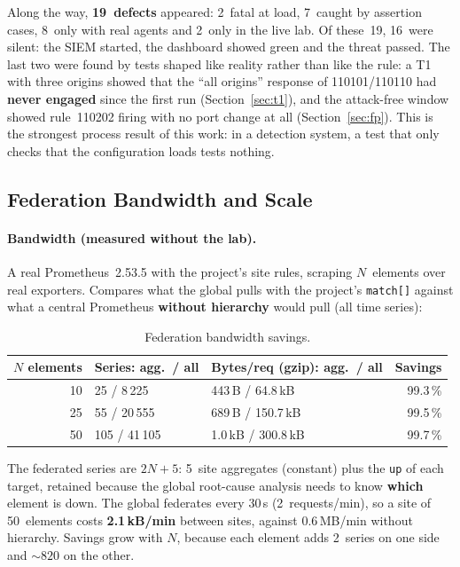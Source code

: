 \documentclass[11pt,a4paper]{article}
\begin{document}
Along the way, \textbf{19~defects} appeared: 2~fatal at load, 7~caught by assertion cases,
8~only with real agents and 2~only in the live lab. Of these~19, 16~were silent: the SIEM
started, the dashboard showed green and the threat passed. The last two were found by tests
shaped like reality rather than like the rule: a T1 with three origins showed that the
``all origins'' response of 110101/110110 had \textbf{never engaged} since the first run
(Section~\ref{sec:t1}), and the attack-free window showed rule~110202 firing with no port
change at all (Section~\ref{sec:fp}). This is the strongest process result of this work: in a
detection system, a test that only checks that the configuration loads tests nothing.

\subsection{Federation Bandwidth and Scale}

\paragraph{Bandwidth (measured without the lab).} A real Prometheus~2.53.5 with the project's
site rules, scraping $N$~elements over real exporters. Compares what the global pulls with
the project's \texttt{match[]} against what a central Prometheus \textbf{without hierarchy}
would pull (all time series):

\begin{table}[H]
  \centering
  \caption{Federation bandwidth savings.}
  \begin{tabular}{@{}rp{3.5cm}p{3.5cm}r@{}}
    \toprule
    \textbf{$N$ elements} & \textbf{Series: agg.\ / all} & \textbf{Bytes/req (gzip): agg.\ / all} &
      \textbf{Savings} \\
    \midrule
    10 & 25 / 8\,225 & 443\,B / 64.8\,kB & 99.3\,\% \\
    25 & 55 / 20\,555 & 689\,B / 150.7\,kB & 99.5\,\% \\
    50 & 105 / 41\,105 & 1.0\,kB / 300.8\,kB & 99.7\,\% \\
    \bottomrule
  \end{tabular}
\end{table}

The federated series are $2N + 5$: 5~site aggregates (constant) plus the \texttt{up} of each
target, retained because the global root-cause analysis needs to know \textbf{which} element
is down. The global federates every 30\,s (2~requests/min), so a site of 50~elements costs
\textbf{2.1\,kB/min} between sites, against 0.6\,MB/min without hierarchy. Savings grow with $N$, because each
element adds 2~series on one side and ${\sim}820$ on the other.
\end{document}
